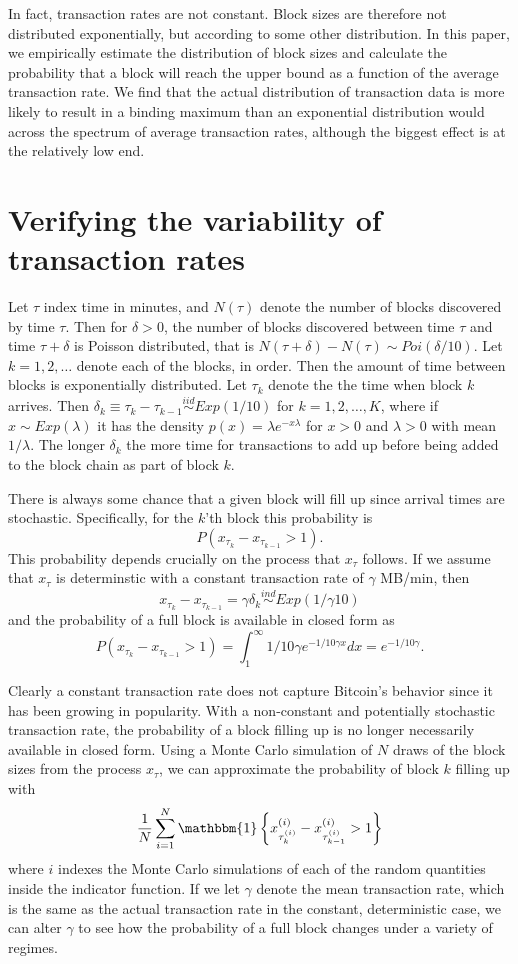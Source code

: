\documentclass{article}
\begin{document}
In fact, transaction rates are not constant. Block sizes are therefore not distributed exponentially, but according to some other distribution. In this paper, we empirically estimate the distribution of block sizes and calculate the probability that a block will reach the upper bound as a function of the average transaction rate. We find that the actual distribution of transaction data is more likely to result in a binding maximum than an exponential distribution would across the spectrum of average transaction rates, although the biggest effect is at the relatively low end.



\section{Verifying the variability of transaction rates}
Let $\tau$ index time in minutes, and $N(\tau)$ denote the number of blocks discovered by time $\tau$. Then for $\delta > 0$, the number of blocks discovered between time $\tau$ and time $\tau + \delta$ is Poisson distributed, that is $N(\tau + \delta) - N(\tau) \sim Poi(\delta/10)$. Let $k=1,2,\dots$ denote each of the blocks, in order. Then the amount of time between blocks is exponentially distributed. Let $\tau_k$ denote the the time when block $k$ arrives. Then $\delta_k \equiv \tau_{k} - \tau_{k-1} \stackrel{iid}{\sim} Exp(1/10)$ for $k=1,2,\dots,K$, where if $x\sim Exp(\lambda)$ it has the density $p(x) = \lambda e^{-x\lambda}$ for $x>0$ and $\lambda>0$ with mean $1/\lambda$. The longer $\delta_k$ the more time for transactions to add up before being added to the block chain as part of block $k$.

There is always some chance that a given block will fill up since arrival times are stochastic. Specifically, for the $k$'th block this probability is
\[
P\left(x_{\tau_k} - x_{\tau_{k-1}} > 1\right).
\]
This probability depends crucially on the process that $x_\tau$ follows. If we assume that $x_{\tau}$ is determinstic with a constant transaction rate of $\gamma$ MB/min, then 
\[
x_{\tau_k} - x_{\tau_{k-1}} = \gamma\delta_k \stackrel{ind}{\sim} Exp(1/\gamma 10)
\]
and the probability of a full block is available in closed form as
\[
P\left(x_{\tau_k} - x_{\tau_{k-1}} > 1\right) = \int_1^\infty 1/10\gamma e^{-1/10\gamma x}dx = e^{-1/10\gamma}.
\]

Clearly a constant transaction rate does not capture Bitcoin's behavior since it has been growing in popularity. With a non-constant and potentially stochastic transaction rate, the probability of a block filling up is no longer necessarily available in closed form. Using a Monte Carlo simulation of $N$ draws of the block sizes from the process $x_{\tau}$, we can approximate the probability of block $k$ filling up with
\[
\frac{1}{N}\sum_{i=1}^N\mathbbm{1}\left\{x^{(i)}_{\tau_{k}^{(i)}} - x^{(i)}_{\tau_{k-1}^{(i)}} > 1\right\}
\]
where $i$ indexes the Monte Carlo simulations of each of the random quantities inside the indicator function. If we let $\gamma$ denote the mean transaction rate, which is the same as the actual transaction rate in the constant, deterministic case, we can alter $\gamma$ to see how the probability of a full block changes under a variety of regimes.
\end{document}
